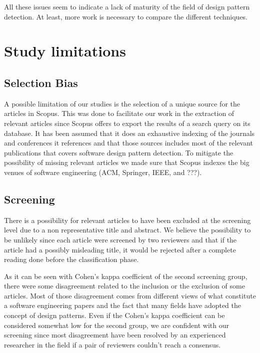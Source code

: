\documentclass[letterpaper, 10 pt, conference]{ieeeconf}  %
\begin{document}
All these issues seem to indicate a lack of maturity of the field of design
pattern detection.
At least, more work is necessary to compare the different techniques.


\section{Study limitations}

\subsection{Selection Bias}

A possible limitation of our studies is the selection of a unique source for 
the articles in Scopus.
This was done to facilitate our work in the extraction of relevant articles
since Scopus offers to export the results of a search query on its database.
It has been assumed that it does an exhaustive indexing of the journals
and conferences it references and that those sources includes most of the
relevant publications that covers software design pattern detection.
To mitigate the possibility of missing relevant articles we made sure that
Scopus indexes the big venues of software engineering (ACM, Springer, IEEE, and
???).

\subsection{Screening}

There is a possibility for relevant articles to have been excluded at the
screening level due to a non representative title and abstract.
We believe the possibility to be unlikely since each article were screened by
two reviewers and that if the article had a possibly misleading title, it would
be rejected after a complete reading done before the classification phase.

As it can be seen with Cohen's kappa coefficient of the second screening group,
there were some disagreement related to the inclusion or the exclusion of some
articles.
Most of those disagreement comes from different views of what constitute a
software engineering papers and the fact that many fields have adopted the
concept of design patterns.
Even if the Cohen's kappa coefficient can be considered somewhat low for the
second group, we are confident with our screening since most disagreement have
been resolved by an experienced researcher in the field if a pair of reviewers
couldn't reach a consensus.
\end{document}
